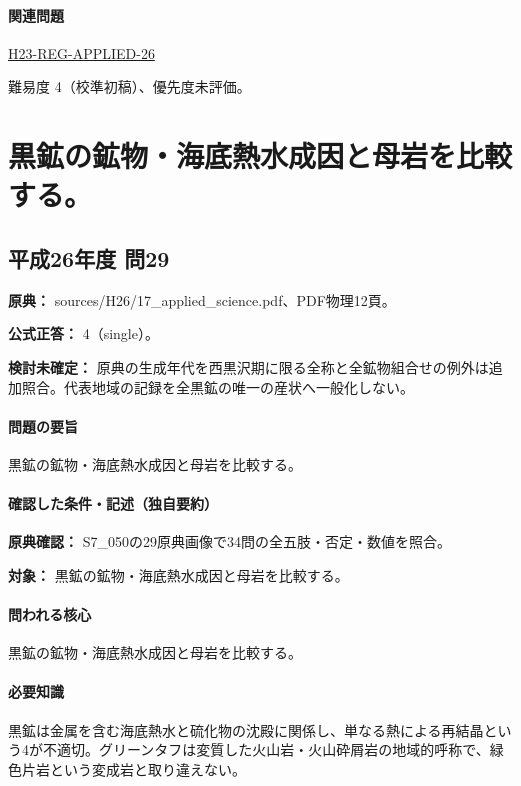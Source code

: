 \paragraph{関連問題} \hyperref[q:h23-reg-applied-26]{H23-REG-APPLIED-26}

\par 難易度 4（校準初稿）、優先度未評価。

\section{黒鉱の鉱物・海底熱水成因と母岩を比較する。}

\subsection{平成26年度 問29}
\label{q:h26-reg-applied-29}

\noindent\textbf{原典：} sources/H26/17\_applied\_science.pdf、PDF物理12頁。

\textbf{公式正答：} 4（single）。

\par\textbf{検討未確定：} 原典の生成年代を西黒沢期に限る全称と全鉱物組合せの例外は追加照合。代表地域の記録を全黒鉱の唯一の産状へ一般化しない。

\paragraph{問題の要旨} 黒鉱の鉱物・海底熱水成因と母岩を比較する。

\paragraph{確認した条件・記述（独自要約）}\mbox{}\par

\noindent\textbf{原典確認：} S7\_050の29原典画像で34問の全五肢・否定・数値を照合。\par

\noindent\textbf{対象：} 黒鉱の鉱物・海底熱水成因と母岩を比較する。\par

\paragraph{問われる核心} 黒鉱の鉱物・海底熱水成因と母岩を比較する。

\paragraph{必要知識} 黒鉱は金属を含む海底熱水と硫化物の沈殿に関係し、単なる熱による再結晶という4が不適切。グリーンタフは変質した火山岩・火山砕屑岩の地域的呼称で、緑色片岩という変成岩と取り違えない。

